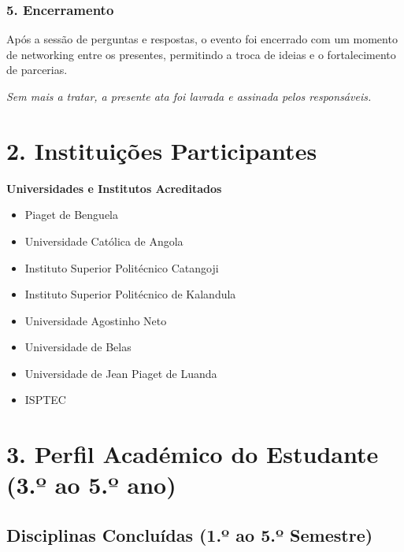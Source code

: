 \documentclass[11pt,a4paper]{article}
\newcommand{\mysection}[1]{
  {\noindent\large\textbf{\textcolor{darkmain}{#1}}}
  \vspace{6pt}
}
\begin{document}
\subsubsection*{5. Encerramento}

Após a sessão de perguntas e respostas, o evento foi encerrado com um momento de networking entre os presentes, permitindo a troca de ideias e o fortalecimento de parcerias.

\vspace{12pt}

\textit{Sem mais a tratar, a presente ata foi lavrada e assinada pelos responsáveis.}

\newpage

\section*{2. Instituições Participantes}

\mysection{Universidades e Institutos Acreditados}

\begin{tcolorbox}[colback=petrogreen!10, colframe=petrogreen]
\begin{itemize}
  \item Piaget de Benguela
  \item Universidade Católica de Angola
  \item Instituto Superior Politécnico Catangoji
  \item Instituto Superior Politécnico de Kalandula
  \item Universidade Agostinho Neto
  \item Universidade de Belas
  \item Universidade de Jean Piaget de Luanda
  \item ISPTEC
\end{itemize}
\end{tcolorbox}

\newpage

\section*{3. Perfil Académico do Estudante (3.º ao 5.º ano)}

\subsection*{Disciplinas Concluídas (1.º ao 5.º Semestre)}
\end{document}
